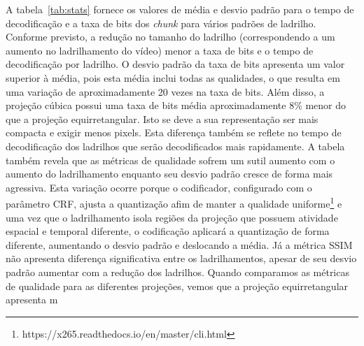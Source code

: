 A tabela~\ref{tab:stats} fornece os valores de média e desvio padrão para o tempo de decodificação e a taxa de bits dos \textit{chunk} para vários padrões de ladrilho. Conforme previsto, a redução no tamanho do ladrilho (correspondendo a um aumento no ladrilhamento do vídeo) menor a taxa de bits e o tempo de decodificação por ladrilho. O desvio padrão da taxa de bits apresenta um valor superior à média, pois esta média inclui todas as qualidades, o que resulta em uma variação de aproximadamente 20 vezes na taxa de bits. Além disso, a projeção cúbica possui uma taxa de bits média aproximadamente 8\% menor do que a projeção equirretangular. Isto se deve a sua representação ser mais compacta e exigir menos pixels. Esta diferença também se reflete no tempo de decodificação dos ladrilhos que serão decodificados mais rapidamente. 
A tabela também revela que as métricas de qualidade sofrem um sutil aumento com o aumento do ladrilhamento enquanto seu desvio padrão cresce de forma mais agressiva. Esta variação ocorre porque o codificador, configurado com o parâmetro CRF, ajusta a quantização afim de manter a qualidade uniforme\footnote{https://x265.readthedocs.io/en/master/cli.html} e uma vez que o ladrilhamento isola regiões da projeção que possuem atividade espacial e temporal diferente, o codificação aplicará a quantização de forma diferente, aumentando o desvio padrão e deslocando a média. %
Já a métrica SSIM não apresenta diferença significativa entre os ladrilhamentos, apesar de seu desvio padrão aumentar com a redução dos ladrilhos. Quando comparamos as métricas de qualidade para as diferentes projeções, vemos que a projeção equirretangular apresenta m

